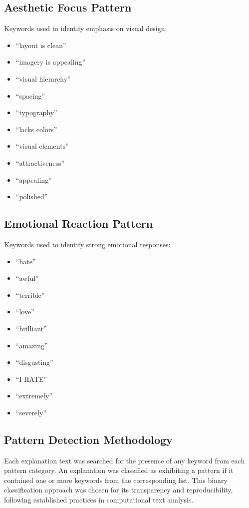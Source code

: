 \subsection{Aesthetic Focus Pattern}
Keywords used to identify emphasis on visual design:
\begin{itemize}
\item ``layout is clean''
\item ``imagery is appealing''
\item ``visual hierarchy''
\item ``spacing''
\item ``typography''
\item ``lacks colors''
\item ``visual elements''
\item ``attractiveness''
\item ``appealing''
\item ``polished''
\end{itemize}

\subsection{Emotional Reaction Pattern}
Keywords used to identify strong emotional responses:
\begin{itemize}
\item ``hate''
\item ``awful''
\item ``terrible''
\item ``love''
\item ``brilliant''
\item ``amazing''
\item ``disgusting''
\item ``I HATE''
\item ``extremely''
\item ``severely''
\end{itemize}

\subsection{Pattern Detection Methodology}
Each explanation text was searched for the presence of any keyword from each pattern category. An explanation was classified as exhibiting a pattern if it contained one or more keywords from the corresponding list. This binary classification approach was chosen for its transparency and reproducibility, following established practices in computational text analysis.

